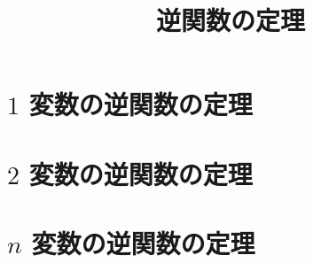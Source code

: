 \documentclass[leqno,autodetect-engine, dvipdfmx-if-dvi,ja=standard]{bxjsarticle}
\title{逆関数の定理}
\begin{document}
	\section{$1$ 変数の逆関数の定理}
	\section{$2$ 変数の逆関数の定理}
	\section{$n$ 変数の逆関数の定理}
\end{document}
